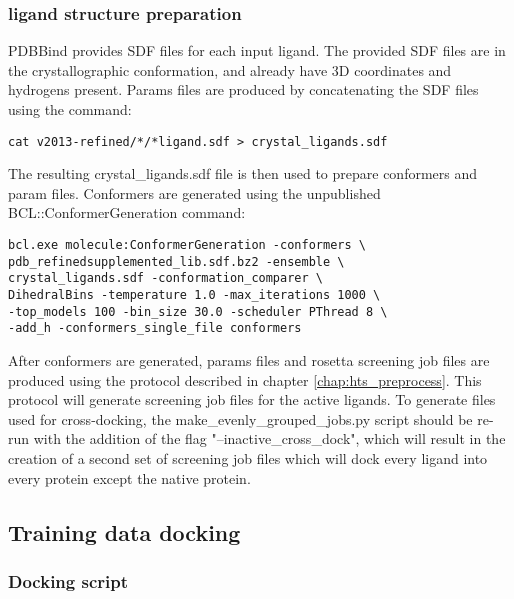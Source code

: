 \subsubsection{ligand structure preparation}

PDBBind provides SDF files for each input ligand.
The provided SDF files are in the crystallographic conformation, and already have 3D coordinates and hydrogens present. 
Params files are produced by concatenating the SDF files using the command:
\singlespace
\begin{Verbatim}
cat v2013-refined/*/*ligand.sdf > crystal_ligands.sdf
\end{Verbatim}
\doublespace
The resulting crystal\_ligands.sdf file is then used to prepare conformers and param files.
Conformers are generated using the unpublished BCL::ConformerGeneration command:
\singlespace
\begin{verbatim}
bcl.exe molecule:ConformerGeneration -conformers \
pdb_refinedsupplemented_lib.sdf.bz2 -ensemble \
crystal_ligands.sdf -conformation_comparer \
DihedralBins -temperature 1.0 -max_iterations 1000 \
-top_models 100 -bin_size 30.0 -scheduler PThread 8 \
-add_h -conformers_single_file conformers
\end{verbatim}
\doublespace
After conformers are generated, params files and rosetta screening job files are produced using the protocol described in chapter \ref{chap:hts_preprocess}.
This protocol will generate screening job files for the active ligands.
To generate files used for cross-docking, the make\_evenly\_grouped\_jobs.py script should be re-run with the addition of the flag "--inactive\_cross\_dock", which will result in the creation of a second set of screening job files which will dock every ligand into every protein except the native protein.

\subsection{Training data docking}

\subsubsection{Docking script}

